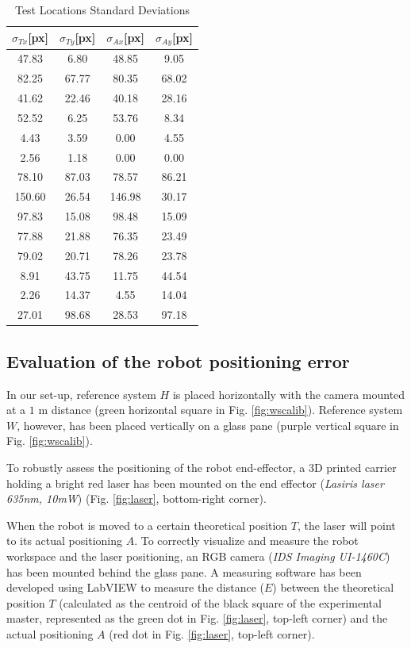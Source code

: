 \documentclass[a4paper, 10 pt, conference]{ieeeconf}      %
\begin{document}
\begin{table}[h]
\begin{center}
\caption{Test Locations Standard Deviations}
\label{tab:firm}
\begin{tabular}{|c||c||c||c|}
\hline
$\sigma_{Tx}$[px] & $\sigma_{Ty}$[px] & $\sigma_{Ax}$[px] & $\sigma_{Ay}$[px] \\
\hline
47.83 & 6.80 & 48.85 & 9.05\\
82.25 & 67.77 & 80.35 & 68.02\\
41.62 & 22.46 & 40.18 & 28.16\\
52.52 & 6.25 & 53.76 & 8.34\\
4.43 & 3.59 & 0.00 & 4.55\\
2.56 & 1.18 & 0.00 & 0.00\\
78.10 & 87.03 & 78.57 & 86.21\\
150.60 & 26.54 & 146.98 & 30.17\\
97.83 & 15.08 & 98.48 & 15.09\\
77.88 & 21.88 & 76.35 & 23.49\\
79.02 & 20.71 & 78.26 & 23.78\\
8.91 & 43.75 & 11.75 & 44.54\\
2.26 & 14.37 & 4.55 & 14.04\\
27.01 & 98.68 & 28.53 & 97.18\\
\hline
\end{tabular}
\end{center}
\end{table}

\subsection{Evaluation of the robot positioning error}

In our set-up, reference system $H$ is placed horizontally with the camera mounted at a $1$ m distance (green horizontal square in Fig. \ref{fig:wscalib}). Reference system $W$, however, has been placed vertically on a glass pane (purple vertical square in Fig. \ref{fig:wscalib}).

To robustly assess the positioning of the robot end-effector, a 3D printed carrier holding a bright red laser has been mounted on the end effector (\textit{Lasiris laser 635nm, 10mW}) (Fig. \ref{fig:laser}, bottom-right corner).

When the robot is moved to a certain theoretical position $T$, the laser will point to its actual positioning $A$. To correctly visualize and measure the robot workspace and the laser positioning, an RGB camera (\textit{IDS Imaging UI-1460C}) has been mounted behind the glass pane.
A measuring software has been developed using LabVIEW to measure the distance ($E$) between the theoretical position $T$ (calculated as the centroid of the black square of the experimental master, represented as the green dot in Fig. \ref{fig:laser}, top-left corner) and the actual positioning $A$ (red dot in Fig. \ref{fig:laser}, top-left corner).
\end{document}
